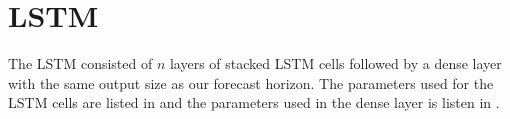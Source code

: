 \section{LSTM}




The LSTM consisted of $n$ layers of stacked LSTM cells followed by a
dense layer with the same output size as our forecast horizon.
The parameters used for the LSTM cells are listed in 
and the parameters used in the dense layer is listen in .

